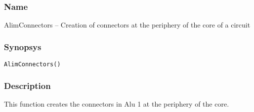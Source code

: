 \subsubsection{Name}

AlimConnectors -- Creation of connectors at the periphery of the core of a circuit

\subsubsection{Synopsys}

\begin{verbatim}
AlimConnectors()
\end{verbatim}

\subsubsection{Description}

This function creates the connectors in Alu 1 at the periphery of the core.
    
  
    
          

